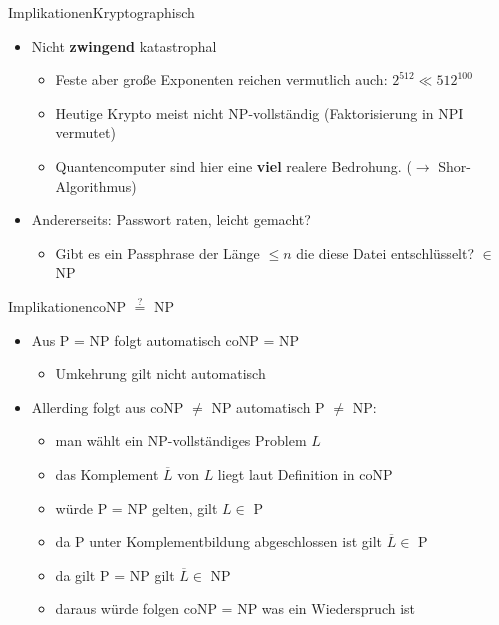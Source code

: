 \documentclass[ignorenonframetext,]{beamer}
\begin{document}
\begin{frame}{Implikationen}{Kryptographisch}

\begin{itemize}
\itemsep1pt\parskip0pt
\item
  Nicht \textbf{zwingend} katastrophal

  \begin{itemize}
  \itemsep1pt\parskip0pt
  \item
    Feste aber große Exponenten reichen vermutlich auch:
    $2^{512} \ll 512^{100}$
  \item
    Heutige Krypto meist nicht NP-vollständig (Faktorisierung in NPI
    vermutet)
  \item
    Quantencomputer sind hier eine \textbf{viel} realere Bedrohung.
    ($\rightarrow$ Shor-Algorithmus)
  \end{itemize}
\item
  Andererseits: Passwort raten, leicht gemacht?

  \begin{itemize}
  \itemsep1pt\parskip0pt
  \item
    Gibt es ein Passphrase der Länge $\le n$ die diese Datei
    entschlüsselt? $\in$ NP
  \end{itemize}
\end{itemize}

\end{frame}

\begin{frame}{Implikationen}{coNP $\stackrel{?}{=}$ NP}

\begin{itemize}
\itemsep1pt\parskip0pt
\item
  Aus P = NP folgt automatisch coNP = NP

  \begin{itemize}
  \itemsep1pt\parskip0pt
  \item
    Umkehrung gilt nicht automatisch
  \end{itemize}
\item
  Allerding folgt aus coNP $\neq$ NP automatisch P $\neq$ NP:

  \begin{itemize}
  \itemsep1pt\parskip0pt
  \item
    man wählt ein NP-vollständiges Problem $L$
  \item
    das Komplement $\overline{L}$ von $L$ liegt laut Definition in coNP
  \item
    würde P = NP gelten, gilt $L \in$ P
  \item
    da P unter Komplementbildung abgeschlossen ist gilt
    $\overline{L} \in$ P
  \item
    da gilt P = NP gilt $\overline{L} \in$ NP
  \item
    daraus würde folgen coNP = NP was ein Wiederspruch ist
  \end{itemize}
\end{itemize}

\end{frame}
\end{document}
